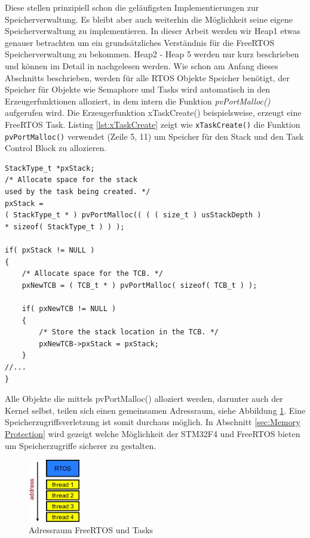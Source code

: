    
Diese stellen prinzipiell schon die ge\-läu\-figsten Implementierungen zur Speicherverwaltung. Es bleibt aber auch weiterhin die Möglichkeit seine eigene Speicherverwaltung zu implementieren. In dieser Arbeit werden wir Heap1 etwas genauer betrachten um ein grund\-sätz\-liches Verständnis für die FreeRTOS Speicherverwaltung zu bekommen. Heap2 - Heap 5 werden nur kurz beschrieben und können im Detail in \cite{MasteringFreeRTOS}\cite{FreeRTOSAdvanced} nachgelesen werden.      
Wie schon am Anfang dieses Abschnitts beschrieben, werden für alle RTOS Objekte Speicher benötigt, der Speicher für Objekte wie Semaphore und Tasks wird automatisch in den Erzeugerfunktionen alloziert, in dem intern die Funktion \textit{pvPortMalloc()} aufgerufen wird. Die Erzeugerfunktion xTaskCreate() beispielsweise, erzeugt eine FreeRTOS Task. Listing \ref{lst:xTaskCreate} zeigt wie \verb|xTaskCreate()| die Funktion \verb|pvPortMalloc()| verwendet (Zeile 5, 11) um Speicher für den Stack und den Task Control Block zu allozieren.
\begin{lstlisting}[caption={xTaskCreate() memory allocation. Aus Task.c}, linewidth=8cm,captionpos=b, label=lst:xTaskCreate, float=hbt]
StackType_t *pxStack;
/* Allocate space for the stack 
used by the task being created. */
pxStack = 
( StackType_t * ) pvPortMalloc(( ( ( size_t ) usStackDepth ) 
* sizeof( StackType_t ) ) );

if( pxStack != NULL )
{
	/* Allocate space for the TCB. */
	pxNewTCB = ( TCB_t * ) pvPortMalloc( sizeof( TCB_t ) );

	if( pxNewTCB != NULL )
	{
		/* Store the stack location in the TCB. */
		pxNewTCB->pxStack = pxStack;
	}
//...
}
\end{lstlisting}
Alle Objekte die mittels pvPortMalloc() alloziert werden, darunter auch der Kernel selbst, teilen sich einen gemeinsamen Adressraum, siehe Abbildung \ref{fig:AddressSpace}. Eine Speicherzugriffsverletzung ist somit durchaus möglich. In Abschnitt \ref{sec:Memory Protection} wird gezeigt welche Möglichkeit der STM32F4 und FreeRTOS bieten um Speicherzugriffe sicherer zu gestalten.    
\begin{figure}[htb!]
	\centering
		\includegraphics[width=0.2\textwidth]{Pictures/EmbeddedCom/addressSpace.jpg}
	\caption{Adressraum FreeRTOS und Tasks}
	\label{fig:AddressSpace}
\end{figure}    
